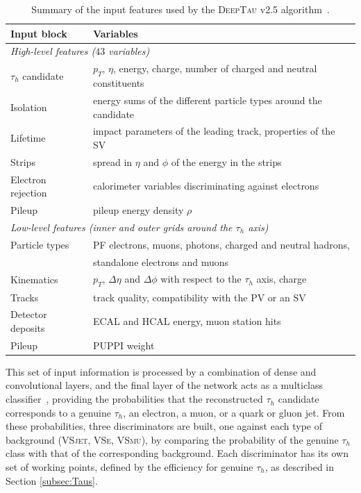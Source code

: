 \begin{table}[h!]
\centering
\small
\begin{tabular}{l l}
\toprule
\textbf{Input block} & \textbf{Variables} \\
\midrule
\midrule
\multicolumn{2}{l}{\textit{High-level features ($43$ variables)}} \\
\midrule
$\tau_h$ candidate & $p_T$, $\eta$, energy, charge, number of charged and neutral constituents \\
Isolation          & energy sums of the different particle types around the candidate \\
Lifetime           & impact parameters of the leading track, properties of the SV \\
Strips             & spread in $\eta$ and $\phi$ of the energy in the strips \\
Electron rejection & calorimeter variables discriminating against electrons \\
Pileup             & pileup energy density $\rho$ \\
\midrule
\multicolumn{2}{l}{\textit{Low-level features (inner and outer grids around the $\tau_h$ axis)}} \\
\midrule
Particle types     & PF electrons, muons, photons, charged and neutral hadrons, \\
                   & standalone electrons and muons \\
Kinematics         & $p_T$, $\Delta\eta$ and $\Delta\phi$ with respect to the $\tau_h$ axis, charge \\
Tracks             & track quality, compatibility with the PV or an SV \\
Detector deposits  & ECAL and HCAL energy, muon station hits \\
Pileup             & PUPPI weight \\
\bottomrule
\end{tabular}
\caption{Summary of the input features used by the \textsc{DeepTau} v2.5 algorithm~\cite{CMS-TAU-24-001}.}
\label{tab:deeptau_inputs}
\end{table}


This set of input information is processed by a combination of dense and convolutional layers, and the final layer of the network acts as a multiclass classifier~\cite{CMS-TAU-20-001}, providing the probabilities that the reconstructed $\tau_h$ candidate corresponds to a genuine $\tau_h$, an electron, a muon, or a quark or gluon jet. From these probabilities, three discriminators are built, one against each type of background (\textsc{VSjet}, \textsc{VSe}, \textsc{VSmu}), by comparing the probability of the genuine $\tau_h$ class with that of the corresponding background. Each discriminator has its own set of working points, defined by the efficiency for genuine $\tau_h$, as described in Section \ref{subsec:Taus}. 


